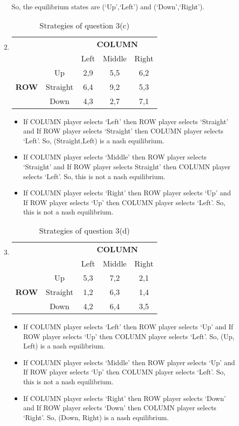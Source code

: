 \documentclass[a4paper,12pt]{article}
\begin{document}
\begin{enumerate}
\begin{enumerate}
 So, the equilibrium states are (`Up',`Left') and (`Down',`Right').
\item
\begin{table}[H]
\centering
\begin{tabular}{@{}ccccc@{}}
\toprule
\multicolumn{2}{c}{} & \multicolumn{3}{c}{\bfseries COLUMN}\\
\multicolumn{2}{c}{} & Left & Middle & Right\\
\multirow{3}{*}{\bfseries ROW} & Up & 2,9 & 5,5 & 6,2\\
 & Straight & 6,4 & 9,2 & 5,3\\
 & Down & 4,3 & 2,7 & 7,1\\
 \bottomrule
\end{tabular}
\caption{Strategies of question 3(c)}
\end{table}
\begin{itemize}
\item
If COLUMN player selects `Left' then ROW player selects `Straight' and If ROW player selects `Straight' then COLUMN player selects `Left'. So, (Straight,Left) is a nash equilibrium.
\item
If COLUMN player selects `Middle' then ROW player selects `Straight' and If ROW player selects Straight' then COLUMN player selects `Left'. So, this is not a nash equilibrium.
\item
If COLUMN player selects `Right' then ROW player selects `Up' and If ROW player selects `Up' then COLUMN player selects `Left'. So, this is not a nash equilibrium.
\end{itemize}

\item
\begin{table}[H]
\centering
\begin{tabular}{@{}ccccc@{}}
\toprule
\multicolumn{2}{c}{} & \multicolumn{3}{c}{\bfseries COLUMN}\\
\multicolumn{2}{c}{} & Left & Middle & Right\\
\multirow{3}{*}{\bfseries ROW} & Up & 5,3 & 7,2 & 2,1\\
 & Straight & 1,2 & 6,3 & 1,4\\
 & Down & 4,2 & 6,4 & 3,5\\
 \bottomrule
\end{tabular}
\caption{Strategies of question 3(d)}
\end{table}
\begin{itemize}
\item
If COLUMN player selects `Left' then ROW player selects `Up' and If ROW player selects `Up' then COLUMN player selects `Left'. So, (Up, Left) is a nash equilibrium.
\item
If COLUMN player selects `Middle' then ROW player selects `Up' and If ROW player selects `Up' then COLUMN player selects `Left'. So, this is not a nash equilibrium.
\item
If COLUMN player selects `Right' then ROW player selects `Down' and If ROW player selects `Down' then COLUMN player selects `Right'. So, (Down, Right) is a nash equilibrium.
\end{itemize}
\end{enumerate}


\end{enumerate}
\end{document}
